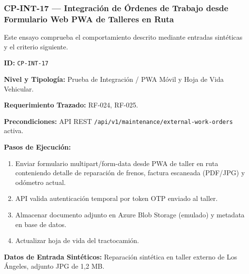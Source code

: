 \subsubsection*{CP-INT-17 — Integración de Órdenes de Trabajo desde Formulario Web PWA de Talleres en Ruta}\label{sec:9-cp-int-17}
Este ensayo comprueba el comportamiento descrito mediante entradas sintéticas y el criterio siguiente.

\par\noindent\textbf{ID:} \texttt{C\allowbreak{}P\allowbreak{}-\allowbreak{}I\allowbreak{}N\allowbreak{}T\allowbreak{}-\allowbreak{}1\allowbreak{}7\allowbreak{}}\par
\par\noindent\textbf{Nivel y Tipología:} Prueba de Integración / PWA Móvil y Hoja de Vida Vehicular.\par
\par\noindent\textbf{Requerimiento Trazado:} RF-024, RF-025.\par
\par\noindent\textbf{Precondiciones:} API REST \texttt{/\allowbreak{}a\allowbreak{}p\allowbreak{}i\allowbreak{}/\allowbreak{}v\allowbreak{}1\allowbreak{}/\allowbreak{}m\allowbreak{}a\allowbreak{}i\allowbreak{}n\allowbreak{}t\allowbreak{}e\allowbreak{}n\allowbreak{}a\allowbreak{}n\allowbreak{}c\allowbreak{}e\allowbreak{}/\allowbreak{}e\allowbreak{}x\allowbreak{}t\allowbreak{}e\allowbreak{}r\allowbreak{}n\allowbreak{}a\allowbreak{}l\allowbreak{}-\allowbreak{}w\allowbreak{}o\allowbreak{}r\allowbreak{}k\allowbreak{}-\allowbreak{}o\allowbreak{}r\allowbreak{}d\allowbreak{}e\allowbreak{}r\allowbreak{}s\allowbreak{}} activa.\par
\par\noindent\textbf{Pasos de Ejecución:} \par
\begin{enumerate}
\item Enviar formulario multipart/form-data desde PWA de taller en ruta conteniendo detalle de reparación de frenos, factura escaneada (PDF/JPG) y odómetro actual.
\item API valida autenticación temporal por token OTP enviado al taller.
\item Almacenar documento adjunto en Azure Blob Storage (emulado) y metadata en base de datos.
\item Actualizar hoja de vida del tractocamión.
\end{enumerate}
\par\noindent\textbf{Datos de Entrada Sintéticos:} Reparación sintética en taller externo de Los Ángeles, adjunto JPG de 1,2 MB.\par
